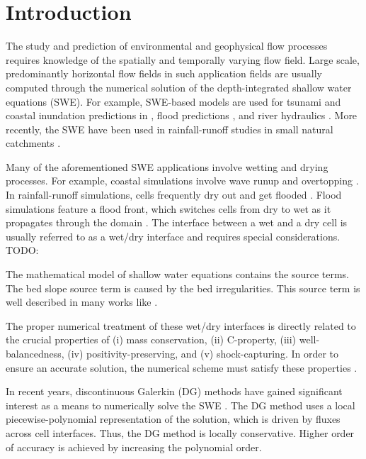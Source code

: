 \section{Introduction}

The study and prediction of environmental and geophysical flow
processes requires knowledge of the spatially and temporally varying
flow field.  Large scale, predominantly horizontal flow fields in such
application fields are usually computed through the numerical solution
of the depth-integrated shallow water equations (SWE).  For example,
SWE-based models are used for tsunami and coastal inundation
predictions in \cite{Marras:2016, Vater2019, Qin:2019}, flood
predictions \cite{George2011, Echeverribar2019}, and river hydraulics
\cite{Persi:2019}.  More recently, the SWE have been used in
rainfall-runoff studies in small natural catchments \cite{Mugler2011,
  Lacasta2014, Simons2014, Xia2019, CaviedesVoullieme2020}.

Many of the aforementioned SWE applications involve wetting and drying
processes.  For example, coastal simulations involve wave runup and
overtopping \cite{Vater20151, Medeiros2013, Vater2019}. In
rainfall-runoff simulations, cells frequently dry out and get flooded
\cite{Simons2014, Lacasta2014, Xia2017}. Flood simulations feature a
flood front, which switches cells from dry to wet as it propagates
through the domain \cite{George2011}.  The interface between a wet and
a dry cell is usually referred to as a wet/dry interface
\cite{Bollermann2013, Beisiegel2015} and requires special
considerations. TODO: 

The mathematical model of shallow water equations contains the source
terms. The bed slope source term is caused by the bed
irregularities. This source term is well described in many works like
\cite{Ambati2007452,Ambati20071233,kesserwani2015,Beisiegel2015,Tassi2007998}.

The proper numerical treatment of these wet/dry interfaces is
directly related to the crucial properties of (i) mass conservation,
(ii) C-property, (iii) well-balancedness, (iv) positivity-preserving,
and (v) shock-capturing.  In order to ensure an accurate solution, the
numerical scheme must satisfy these properties
\cite{CaviedesVoullieme2020}.

In recent years, discontinuous Galerkin (DG) methods have gained
significant interest as a means to numerically solve the SWE
\cite{CaviedesVoullieme2015, kesserwani2015, Vater20151, Marras:2016,
  Kesserwani2019, Vater2019, CaviedesVoullieme2020,
  NavasMontilla2020}.  The DG method uses a local piecewise-polynomial
representation of the solution, which is driven by fluxes across cell
interfaces.  Thus, the DG method is locally conservative.  Higher
order of accuracy is achieved by increasing the polynomial order.


